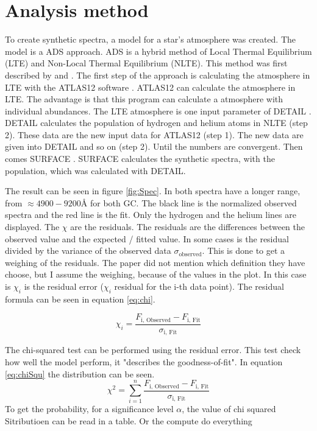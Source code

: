 \documentclass{aa}
\begin{document}
\section{Analysis method}
\label{sec:3}
To create synthetic spectra, a model for a star's atmosphere was created. The model is a ADS approach. ADS is a hybrid method of Local Thermal Equilibrium (LTE) and Non-Local Thermal Equilibrium (NLTE). This method was first described by \cite{2006A&A...445.1099P} and \cite{2007A&A...467..295N}. The first step of the approach is calculating the atmosphere in LTE with the ATLAS12 software \cite{1996ASPC..108....2K}. ATLAS12 can calculate the atmosphere in LTE. The advantage is that this program can calculate a atmosphere with individual abundances. The LTE atmosphere is one input parameter of DETAIL \citep{1981PhDT.......111G}. DETAIL calculates the population of hydrogen and helium atoms in NLTE (step 2).  These data are the new input data for ATLAS12 (step 1). The new data are given into DETAIL and so on (step 2). Until the numbers are convergent. Then comes SURFACE \citep{1981PhDT.......111G}. SURFACE calculates the synthetic spectra, with the population, which was calculated with DETAIL. 

The result can be seen in figure \ref{fig:Spec}. In \cite{2023A&A...677A..86L} both spectra have a longer range, from $\approx 4900 - 9200 \text{\AA}$ for both GC. The black line is the normalized observed spectra and the red line is the fit. Only the hydrogen and the helium lines are displayed. The $\chi$ are the residuals. The residuals are the differences between the observed value and the expected / fitted value. In some cases is the residual divided by the variance of the observed data $\sigma_\text{observed}$. This is done to get a weighing of the residuals. The paper did not mention which definition they have choose, but I assume the weighing, because of the values in the plot. In this case is $\chi_i$ is the residual error ($\chi_i$ residual for the i-th data point). The residual formula can be seen in equation \ref{eq:chi}. 

\begin{equation}
\label{eq:chi}
\chi_i = \frac{F_\text{i, Observed}-F_\text{i, Fit}}{\sigma_\text{i, Fit}}
\end{equation}

The chi-squared test can be performed using the residual error. This test check how well the model perform, it "describes the goodness-of-fit". In equation \ref{eq:chiSqu} the distribution can be seen. 
\begin{equation}
\label{eq:chiSqu}
\chi^2 = \sum_{i=1}^n \frac{F_\text{i, Observed}-F_\text{i, Fit}}{\sigma_\text{i, Fit}}
\end{equation}
To get the probability, for a significance level $\alpha$, the value of chi squared Sitributioen can be read in a table. Or the compute do everything 
\end{document}
